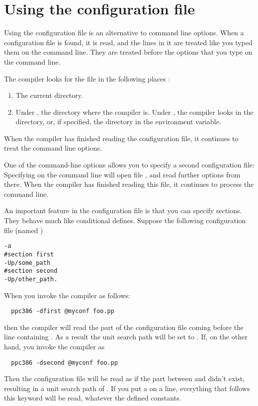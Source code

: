 \documentclass{report}
\begin{document}
\section{Using the configuration file}
\label{se:config_file}
Using the configuration file  is an alternative to command
line options. When a configuration file is found, it is read, and the lines
in it are treated like you typed them on the command line. They are treated
before the options that you type on the command line.

The compiler looks for the  file in the following places :
\begin{enumerate}
\item The current directory.
\item Under \dos, the directory where the compiler is. Under \linux, 
       the compiler looks in the  directory, or, if specified,
the directory in the  environment variable.
\end{enumerate}
When the compiler has finished reading the configuration file, it continues
to treat the command line options.

One of the command-line options allows you to specify a second configuration
file: Specifying  on the command line will open file ,
and read further options from there. When the compiler has finished reading
this file, it continues to process the command line.

An important feature in the configuration file is that you can specify
sections. They behave much like conditional defines. 
Suppose the following configuration file (named )
\begin{verbatim}
-a
#section first
-Up/some_path
#section second
-Up/other_path.
\end{verbatim}
When you invoke the compiler as follows:
\begin{verbatim}
  ppc386 -dfirst @myconf foo.pp
\end{verbatim}
then the compiler will read the part of the configuration file coming before
the line containing . As a result the unit search path will be set
to .
If, on the other hand, you invoke the compiler as 
\begin{verbatim}
  ppc386 -dsecond @myconf foo.pp
\end{verbatim}
Then the configuration file will be read as if the part between
 and  didn't exist, resulting
in a unit search path of .
If you put a  on a line, everything that follows this
keyword will be read, whatever the defined constants.
\end{document}
